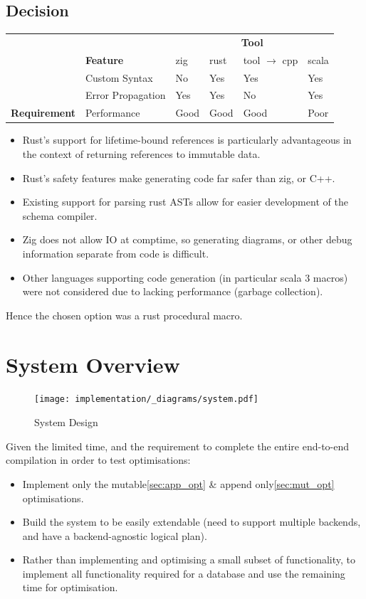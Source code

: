 \subsection{Decision}
\begin{center}
    \begin{tabular}{l l | l l l l}
        & & \multicolumn{4}{c}{\textbf{Tool}} \\
        & \textbf{Feature}                         & zig  & rust & tool $\to$ cpp & scala \\
        \hline
        & Custom Syntax     & No   & Yes  & Yes            & Yes   \\
        & Error Propagation & Yes  & Yes  & No             & Yes   \\
        \textbf{Requirement} & Performance       & Good & Good & Good           & Poor  \\
    \end{tabular}
\end{center}
\begin{itemize}
    \setlength\itemsep{0em}
    \item Rust's support for lifetime-bound references is particularly advantageous in the context of returning references to immutable data.
    \item Rust's safety features make generating code far safer than zig, or C++.
    \item Existing support for parsing rust ASTs allow for easier development of the schema compiler.
    \item Zig does not allow IO at comptime, so generating diagrams, or other debug information separate from code is difficult.
    \item Other languages supporting code generation (in particular scala 3 macros) were not considered due to lacking performance (garbage collection).
\end{itemize}
Hence the chosen option was a rust procedural macro.

\section{System Overview}
\begin{figure}[h!]
    \centering
    \texttt{[image: implementation/\_diagrams/system.pdf]}
    \caption{System Design}
\end{figure}
\noindent
Given the limited time, and the requirement to complete the entire end-to-end compilation in order to test optimisations:
\begin{itemize}
    \setlength\itemsep{0em}
    \item Implement only the mutable\ref{sec:app_opt} \& append only\ref{sec:mut_opt} optimisations.
    \item Build the system to be easily extendable (need to support multiple backends, and have a backend-agnostic logical plan).
    \item Rather than implementing and optimising a small subset of functionality, to implement all functionality required for a database and use the remaining time for optimisation.
\end{itemize}


